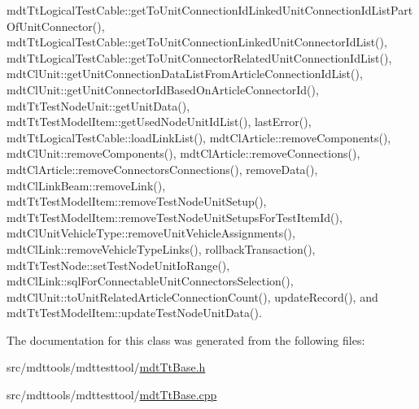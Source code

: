 mdt\-Tt\-Logical\-Test\-Cable\-::get\-To\-Unit\-Connection\-Id\-Linked\-Unit\-Connection\-Id\-List\-Part\-Of\-Unit\-Connector(), mdt\-Tt\-Logical\-Test\-Cable\-::get\-To\-Unit\-Connection\-Linked\-Unit\-Connector\-Id\-List(), mdt\-Tt\-Logical\-Test\-Cable\-::get\-To\-Unit\-Connector\-Related\-Unit\-Connection\-Id\-List(), mdt\-Cl\-Unit\-::get\-Unit\-Connection\-Data\-List\-From\-Article\-Connection\-Id\-List(), mdt\-Cl\-Unit\-::get\-Unit\-Connector\-Id\-Based\-On\-Article\-Connector\-Id(), mdt\-Tt\-Test\-Node\-Unit\-::get\-Unit\-Data(), mdt\-Tt\-Test\-Model\-Item\-::get\-Used\-Node\-Unit\-Id\-List(), last\-Error(), mdt\-Tt\-Logical\-Test\-Cable\-::load\-Link\-List(), mdt\-Cl\-Article\-::remove\-Components(), mdt\-Cl\-Unit\-::remove\-Components(), mdt\-Cl\-Article\-::remove\-Connections(), mdt\-Cl\-Article\-::remove\-Connectors\-Connections(), remove\-Data(), mdt\-Cl\-Link\-Beam\-::remove\-Link(), mdt\-Tt\-Test\-Model\-Item\-::remove\-Test\-Node\-Unit\-Setup(), mdt\-Tt\-Test\-Model\-Item\-::remove\-Test\-Node\-Unit\-Setups\-For\-Test\-Item\-Id(), mdt\-Cl\-Unit\-Vehicle\-Type\-::remove\-Unit\-Vehicle\-Assignments(), mdt\-Cl\-Link\-::remove\-Vehicle\-Type\-Links(), rollback\-Transaction(), mdt\-Tt\-Test\-Node\-::set\-Test\-Node\-Unit\-Io\-Range(), mdt\-Cl\-Link\-::sql\-For\-Connectable\-Unit\-Connectors\-Selection(), mdt\-Cl\-Unit\-::to\-Unit\-Related\-Article\-Connection\-Count(), update\-Record(), and mdt\-Tt\-Test\-Model\-Item\-::update\-Test\-Node\-Unit\-Data().



The documentation for this class was generated from the following files\-:\begin{DoxyCompactItemize}
\item 
src/mdttools/mdttesttool/\hyperlink{mdt_tt_base_8h}{mdt\-Tt\-Base.\-h}\item 
src/mdttools/mdttesttool/\hyperlink{mdt_tt_base_8cpp}{mdt\-Tt\-Base.\-cpp}\end{DoxyCompactItemize}
